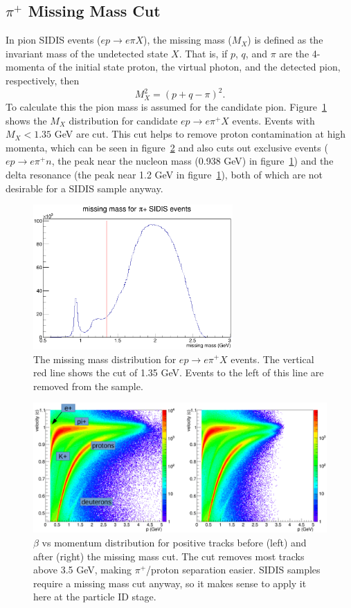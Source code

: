 \subsection{$\pi^+$ Missing Mass Cut}
In pion SIDIS events ($ep \rightarrow e\pi X$), the missing mass ($M_X$) is defined as the invariant mass of the undetected state $X$.
That is, if $p$, $q$, and $\pi$ are the 4-momenta of the initial state proton, the virtual photon, and the detected pion, respectively, then
\begin{equation}
\label{eq:missingMassDefinition}
M_X^2 = \left( p + q - \pi \right)^2.
\end{equation}
To calculate this the pion mass is assumed for the candidate pion.
Figure~\ref{fig:pipMissingMassCut} shows the $M_X$ distribution for candidate $ep \rightarrow e\pi^+ X$ events.
Events with $M_X < 1.35$ GeV are cut.
This cut helps to remove proton contamination at high momenta, which can be seen in figure~\ref{fig:pip_vvp_beforeAndAfter_MXcut} and also cuts out exclusive events ($ep \rightarrow e\pi^+ n$, the peak near the nucleon mass (0.938 GeV) in figure~\ref{fig:pipMissingMassCut}) and the delta resonance (the peak near 1.2 GeV in figure~\ref{fig:pipMissingMassCut}), both of which are not desirable for a SIDIS sample anyway.
\begin{figure}[htp]
\centering
\includegraphics[width=3in]{figures/pipMissingMassCut.png}
\caption{The missing mass distribution for $ep \rightarrow e\pi^+ X$ events. The vertical red line shows the cut of 1.35 GeV. Events to the left of this line are removed from the sample.}
\label{fig:pipMissingMassCut}
\end{figure}
%
\begin{figure}[htp]
\centering
\includegraphics[width=6in]{figures/pip_vvp_beforeAndAfter_MXcut.png}
\caption{$\beta$ vs momentum distribution for positive tracks before (left) and after (right) the missing mass cut. The cut removes most tracks above 3.5 GeV, making $\pi^+$/proton separation easier. SIDIS samples require a missing mass cut anyway, so it makes sense to apply it here at the particle ID stage.}
\label{fig:pip_vvp_beforeAndAfter_MXcut}
\end{figure}
%
